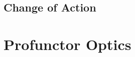 \documentclass[11pt,a4paper]{article}
\makeatletter
\theoremstyle{plain}
\theoremstyle{definition}
\newcommand{\id}{\mathrm{id}}
\providecommand{\leftsquigarrow}{%
  \mathrel{\mathpalette\reflect@squig\relax}%
}
\newcommand{\reflect@squig}[2]{%
  \reflectbox{$\m@th#1\rightsquigarrow$}%
}
\newcommand{\todo}[1]{\textcolor{red}{\small #1}}
\makeatother
\begin{document}
%
%
%

\subsection{Change of Action}

\section{Profunctor Optics}
\end{document}
